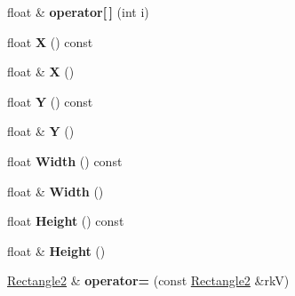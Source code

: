 \begin{DoxyCompactItemize}
\item 
float \& {\bfseries operator\mbox{[}$\,$\mbox{]}} (int i)\hypertarget{class_i_dream_sky_1_1_rectangle2_accba588f3bfe70d039330dd9073ac2fd}{}\label{class_i_dream_sky_1_1_rectangle2_accba588f3bfe70d039330dd9073ac2fd}

\item 
float {\bfseries X} () const \hypertarget{class_i_dream_sky_1_1_rectangle2_ad0808537f6b3228b815437dbe733bd5c}{}\label{class_i_dream_sky_1_1_rectangle2_ad0808537f6b3228b815437dbe733bd5c}

\item 
float \& {\bfseries X} ()\hypertarget{class_i_dream_sky_1_1_rectangle2_ae418c6254fadb0f2114f2efc54ec382f}{}\label{class_i_dream_sky_1_1_rectangle2_ae418c6254fadb0f2114f2efc54ec382f}

\item 
float {\bfseries Y} () const \hypertarget{class_i_dream_sky_1_1_rectangle2_aa66e4d6432e3eb8dda3b27fbff837f15}{}\label{class_i_dream_sky_1_1_rectangle2_aa66e4d6432e3eb8dda3b27fbff837f15}

\item 
float \& {\bfseries Y} ()\hypertarget{class_i_dream_sky_1_1_rectangle2_a12ef0c1eb0f7448f339384a0a961a921}{}\label{class_i_dream_sky_1_1_rectangle2_a12ef0c1eb0f7448f339384a0a961a921}

\item 
float {\bfseries Width} () const \hypertarget{class_i_dream_sky_1_1_rectangle2_ad278919a9b3a83a44154700d86c20dcb}{}\label{class_i_dream_sky_1_1_rectangle2_ad278919a9b3a83a44154700d86c20dcb}

\item 
float \& {\bfseries Width} ()\hypertarget{class_i_dream_sky_1_1_rectangle2_a8a12a35df71e2878282b9ad4def2d4c4}{}\label{class_i_dream_sky_1_1_rectangle2_a8a12a35df71e2878282b9ad4def2d4c4}

\item 
float {\bfseries Height} () const \hypertarget{class_i_dream_sky_1_1_rectangle2_ab6a8b3cfd4ad6fa0cb00a22069981877}{}\label{class_i_dream_sky_1_1_rectangle2_ab6a8b3cfd4ad6fa0cb00a22069981877}

\item 
float \& {\bfseries Height} ()\hypertarget{class_i_dream_sky_1_1_rectangle2_ac3cd75293f21760f36eeb3db4109e4aa}{}\label{class_i_dream_sky_1_1_rectangle2_ac3cd75293f21760f36eeb3db4109e4aa}

\item 
\hyperlink{class_i_dream_sky_1_1_rectangle2}{Rectangle2} \& {\bfseries operator=} (const \hyperlink{class_i_dream_sky_1_1_rectangle2}{Rectangle2} \&rkV)\hypertarget{class_i_dream_sky_1_1_rectangle2_a5cf1684a03edfbd00855bed9fef93b8a}{}\label{class_i_dream_sky_1_1_rectangle2_a5cf1684a03edfbd00855bed9fef93b8a}


\end{DoxyCompactItemize}
